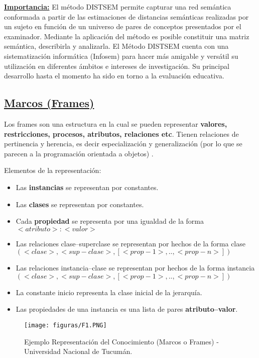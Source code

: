 \documentclass[10pt,conference]{IEEEtran}
\begin{document}
\begin{enumerate}
\textbf{\underline{Importancia:}}
El método DISTSEM permite capturar una red semántica conformada a partir de las estimaciones de distancias semánticas realizadas por un sujeto en función de un universo
de pares de conceptos presentados por el examinador. Mediante la aplicación del método es posible constituir una matriz semántica, describirla y analizarla. El Método
DISTSEM cuenta con una sistematización informática (Infosem) para hacer más amigable y versátil su utilización en diferentes ámbitos e intereses de investigación. Su principal
desarrollo hasta el momento ha sido en torno a la evaluación educativa.
\end{enumerate} 
\subsection{\underline{\textbf{Marcos (Frames)}}}
Los frames son una estructura en la cual se pueden representar \textbf{valores, restricciones, procesos, atributos, relaciones etc}. Tienen relaciones de pertinencia y herencia, es decir especialización y generalización (por lo que se parecen a la programación orientada a objetos) \citep{21Repres15}.

Elementos de la representación:
\begin{itemize}
    \item Las \textbf{instancias} se representan por constantes.
    \item Las \textbf{clases} se representan por constantes.
    \item Cada \textbf{propiedad} se representa por una igualdad de la forma $<atributo>:<valor>$
    \item Las relaciones clase–superclase se representan por hechos de la forma clase $(<clase>,<sup-clase>,[<prop-1>,..,<prop-n>])$
    \item Las relaciones instancia–clase se representan por hechos de la forma
    instancia $(<clase>,<sup-clase>,[<prop-1>,..,<prop-n>])$
    \item La constante inicio representa la clase inicial de la jerarquía.
    \item Las propiedades de una instancia es una lista de pares \textbf{atributo–valor}.
\end{itemize}

\begin{figure}[H]
\begin{center}
\texttt{[image: figuras/F1.PNG]}
\caption{Ejemplo Representación del Conocimiento (Marcos o Frames) - Universidad Nacional de Tucumán.}
\label{F1} 
\end{center}
\end{figure}
\end{document}
